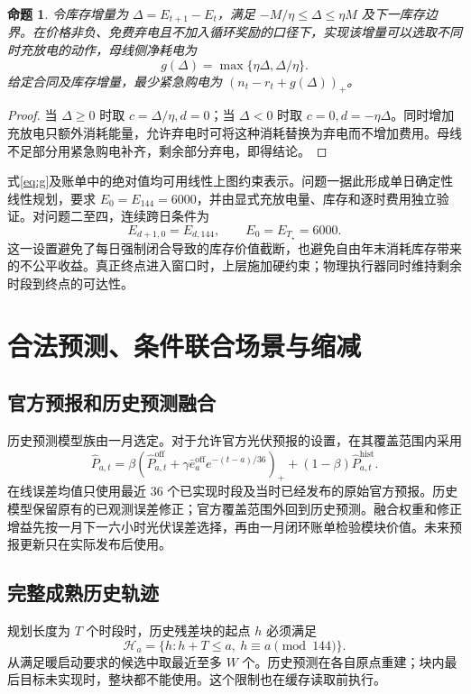 \documentclass[UTF8,a4paper,zihao=-4,fontset=mac]{ctexart}
\newcommand{\pos}[1]{\left(#1\right)_+}
\newtheorem{proposition}{命题}
\begin{document}
\begin{proposition}
令库存增量为 \(\Delta=E_{t+1}-E_t\)，满足 \(-M/\eta\le\Delta\le\eta M\) 及下一库存边界。在价格非负、免费弃电且不加入循环奖励的口径下，实现该增量可以选取不同时充放电的动作，母线侧净耗电为
\begin{equation}\label{eq:g}
g(\Delta)=\max\{\eta\Delta,\Delta/\eta\}.
\end{equation}
给定合同及库存增量，最少紧急购电为 \(\pos{n_t-r_t+g(\Delta)}\)。
\end{proposition}
\begin{proof}
当 \(\Delta\ge0\) 时取 \(c=\Delta/\eta,d=0\)；当 \(\Delta<0\) 时取 \(c=0,d=-\eta\Delta\)。同时增加充放电只额外消耗能量，允许弃电时可将这种消耗替换为弃电而不增加费用。母线不足部分用紧急购电补齐，剩余部分弃电，即得结论。
\end{proof}

式\eqref{eq:g}及账单中的绝对值均可用线性上图约束表示。问题一据此形成单日确定性线性规划，要求 \(E_0=E_{144}=6000\)，并由显式充放电量、库存和逐时费用独立验证。对问题二至四，连续跨日条件为
\begin{equation}
E_{d+1,0}=E_{d,144},\qquad E_0=E_{T_\star}=6000.
\end{equation}
这一设置避免了每日强制闭合导致的库存价值截断，也避免自由年末消耗库存带来的不公平收益。真正终点进入窗口时，上层施加硬约束；物理执行器同时维持剩余时段到终点的可达性。

\section{合法预测、条件联合场景与缩减}
\subsection{官方预报和历史预测融合}
历史预测模型族由一月选定。对于允许官方光伏预报的设置，在其覆盖范围内采用
\begin{equation}
\widehat P_{a,t}=\beta\pos{\widehat P^{\mathrm{off}}_{a,t}+\gamma\bar e_a^{\mathrm{off}}e^{-(t-a)/36}}
+(1-\beta)\widehat P^{\mathrm{hist}}_{a,t}.
\end{equation}
在线误差均值只使用最近 36 个已实现时段及当时已经发布的原始官方预报。历史模型保留原有的已观测误差修正；官方覆盖范围外回到历史预测。融合权重和修正增益先按一月下一六小时光伏误差选择，再由一月闭环账单检验模块价值。未来预报更新只在实际发布后使用。

\subsection{完整成熟历史轨迹}
规划长度为 \(T\) 个时段时，历史残差块的起点 \(h\) 必须满足
\begin{equation}
\mathcal H_a=\{h:h+T\le a,\ h\equiv a\pmod{144}\}.
\end{equation}
从满足暖启动要求的候选中取最近至多 \(W\) 个。历史预测在各自原点重建；块内最后目标未实现时，整块都不能使用。这个限制也在缓存读取前执行。
\end{document}
